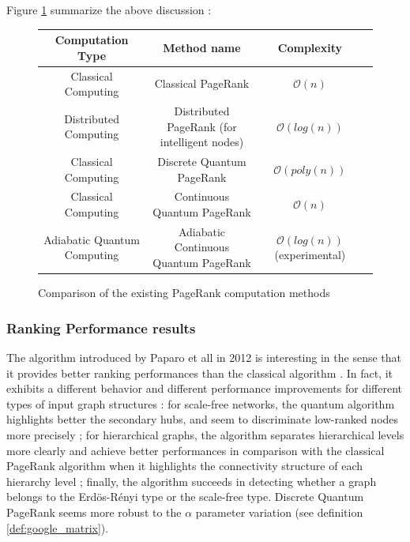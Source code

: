 \documentclass{article}
\begin{document}
Figure \ref{fig:pagerank_computation} summarize the above discussion :

\begin{figure}[h!]\label{fig:pagerank_computation}
    \centering
    \begin{tabular}{|c|c|c|c|}
    \hline
    Computation Type & Method name & Complexity \\
    \hline \hline
    Classical Computing & Classical PageRank & $\mathcal{O}(n)$\\ \hline
    Distributed Computing & Distributed PageRank (for intelligent nodes) & $\mathcal{O}(log(n))$ \\ \hline
    Classical Computing & Discrete Quantum PageRank \cite{paparo_martin-delgado_2012} & $\mathcal{O}(poly(n))$\\ \hline
    Classical Computing & Continuous Quantum PageRank \cite{sánchez-burillo_duch_gómez-gardeñes_zueco_2012} & $\mathcal{O}(n)$\\ \hline
    Adiabatic Quantum Computing & Adiabatic Continuous Quantum PageRank \cite{garnerone_zanardi_lidar_2012} & $\mathcal{O}(log(n))$ (experimental)\\
    \hline
\end{tabular}

    
    \caption{Comparison of the existing PageRank computation methods}
    \label{fig:pagerank_computation}
\end{figure}

\subsubsection{Ranking Performance results}

The algorithm introduced by Paparo et all in 2012 is interesting in the sense that it provides better ranking performances than the classical algorithm \cite{paparo_martin-delgado_2012, paparo_müller_comellas_martin-delgado_2013, paparo_2014}. In fact, it exhibits a different behavior and different performance improvements for different types of input graph structures : for scale-free networks, the quantum algorithm highlights better the secondary hubs, and seem to discriminate low-ranked nodes more precisely ; for hierarchical graphs, the algorithm separates hierarchical levels more clearly and achieve  better performances in comparison with the classical PageRank algorithm when it highlights the connectivity structure of each hierarchy level ; finally, the algorithm succeeds in detecting whether a graph belongs to the Erdös-Rényi type or the scale-free type. Discrete Quantum PageRank seems more robust to the $\alpha$ parameter variation (see definition \ref{def:google_matrix}).
\end{document}
